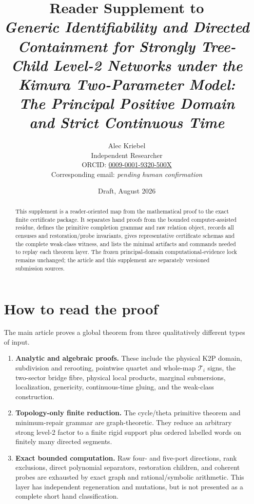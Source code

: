 \documentclass[11pt]{article}
\title{Reader Supplement to\\
\emph{Generic Identifiability and Directed Containment for Strongly
Tree-Child Level-2 Networks under the Kimura Two-Parameter Model:\\
The Principal Positive Domain and Strict Continuous Time}}
\author{Alec Kriebel\\
\small Independent Researcher\\
\small ORCID: \href{https://orcid.org/0009-0001-9320-500X}
{0009-0001-9320-500X}\\
\small Corresponding email: \emph{pending human confirmation}}
\date{Draft, August 2026}
\theoremstyle{remark}
\begin{document}
\maketitle

\begin{abstract}
This supplement is a reader-oriented map from the mathematical proof to the
exact finite certificate package.  It separates hand proofs from the bounded
computer-assisted residue, defines the primitive completion grammar and raw
relation object, records all censuses and restoration/probe invariants, gives
representative certificate schemas and the complete weak-class witness, and
lists the minimal artifacts and commands needed to replay each theorem layer.
The frozen principal-domain computational-evidence lock remains unchanged;
the article and this supplement are separately versioned submission sources.
\end{abstract}

\tableofcontents

\section{How to read the proof}\label{sec:guide}

The main article proves a global theorem from three qualitatively different
types of input.

\begin{enumerate}[label=\textbf{P\arabic*.}]
  \item \textbf{Analytic and algebraic proofs.}  These include the physical
        K2P domain, subdivision and rerooting, pointwise quartet and
        whole-map \(\mathcal T_i\) signs, the two-sector bridge fibre, physical local
        products, marginal submersions, localization, genericity,
        continuous-time gluing, and the weak-class construction.
  \item \textbf{Topology-only finite reduction.}  The cycle/theta primitive
        theorem and minimum-repair grammar are graph-theoretic.  They reduce
        an arbitrary strong level-2 factor to a finite rigid support plus
        ordered labelled words on finitely many directed segments.
  \item \textbf{Exact bounded computation.}  Raw four- and five-port
        directions, rank exclusions, direct polynomial separators,
        restoration children, and coherent probes are exhausted by exact
        graph and rational/symbolic arithmetic.  This layer has independent
        regeneration and mutations, but is not presented as a complete short
        hand classification.
\end{enumerate}
\end{document}
